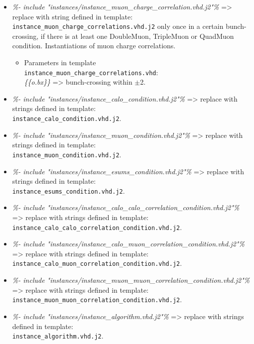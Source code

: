 \begin{itemize}
\item \textit{{\%- include "instances/instance\_muon\_charge\_correlation.vhd.j2"\%}} => replace with string defined in template:\\
\texttt{instance\_muon\_charge\_correlations.vhd.j2} only once in a certain bunch-crossing,
if there is at least one DoubleMuon, TripleMuon or QuadMuon condition. Instantiations of muon charge correlations.
    \begin{itemize}
    \item Parameters in template\\ \texttt{instance\_muon\_charge\_correlations.vhd}:\\
    \textit{\{\{o.bx\}\}} => bunch-crossing within $\pm$2.
    \end{itemize}
\end{itemize}
\begin{itemize}
\item \textit{{\%- include "instances/instance\_calo\_condition.vhd.j2"\%}} => replace with strings defined in template:\\
\texttt{instance\_calo\_condition.vhd.j2}.\\
\item \textit{{\%- include "instances/instance\_muon\_condition.vhd.j2"\%}} => replace with strings defined in template:\\
\texttt{instance\_muon\_condition.vhd.j2}.\\
\item \textit{{\%- include "instances/instance\_esums\_condition.vhd.j2"\%}} => replace with strings defined in template:\\
\texttt{instance\_esums\_condition.vhd.j2}.\\
\item \textit{{\%- include "instances/instance\_calo\_calo\_correlation\_condition.vhd.j2"\%}} => replace with strings defined in template:\\
\texttt{instance\_calo\_calo\_correlation\_condition.vhd.j2}.\\
\item \textit{{\%- include "instances/instance\_calo\_muon\_correlation\_condition.vhd.j2"\%}} => replace with strings defined in template:\\
\texttt{instance\_calo\_muon\_correlation\_condition.vhd.j2}.\\
\item \textit{{\%- include "instances/instance\_muon\_muon\_correlation\_condition.vhd.j2"\%}} => replace with strings defined in template:\\
\texttt{instance\_muon\_muon\_correlation\_condition.vhd.j2}.\\
\item \textit{{\%- include "instances/instance\_algorithm.vhd.j2"\%}} => replace with strings defined in template:\\
\texttt{instance\_algorithm.vhd.j2}.\\
\end{itemize}

